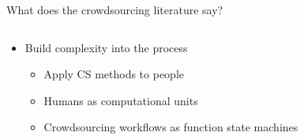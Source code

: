 \documentclass[presentation]{subfiles}
\begin{document}
\begin{frame}{What does the crowdsourcing literature say?}
\begin{columns}
  \begin{column}{0.6\textwidth}
    \begin{itemize}
      \item Build complexity into the process
      \begin{itemize}
        \item<1> Apply CS methods to people

        \scriptsize{
          \textcite{crowdForgeKittur}
        }
        \item<2> Humans as computational units

        \scriptsize{
          \textcite{Lasecki:2014:LSR:2661334.2661352}
        }
        \item<3> Crowdsourcing workflows as function state machines

        \scriptsize{\textcite{latoza2014microtask}
        }
      \end{itemize}
    \end{itemize}
  \end{column}
  
  \begin{column}{0.4\textwidth}
    \begin{figure}
    

\end{figure}
\end{column}
\end{columns}
\end{frame}
\end{document}
